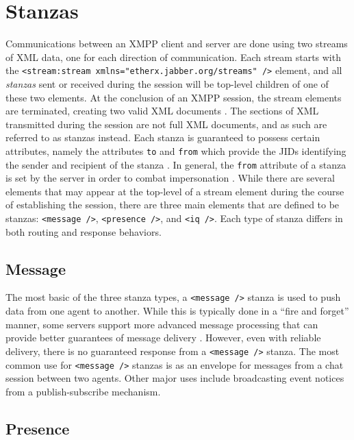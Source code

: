 \section{Stanzas}
\label{sec:Stanzas}

Communications between an XMPP client and server are done using two streams of
XML data, one for each direction of communication. Each stream starts with the
\texttt{<stream:stream xmlns="etherx.jabber.org/streams" />} element, and all
\textit{stanzas} sent or received during the session will be top-level children
of one of these two elements. At the conclusion of an XMPP session, the stream
elements are terminated, creating two valid XML documents \cite{RFC3920}. The
sections of XML transmitted during the session are not full XML documents,
and as such are referred to as stanzas instead. Each stanza is guaranteed to
possess certain attributes, namely the attributes \texttt{to} and \texttt{from}
which provide the JIDs identifying the sender and recipient of the stanza
\cite{RFC3920}. In general, the \texttt{from} attribute of a stanza is set by
the server in order to combat impersonation \cite{RFC3920}. While
there are several elements that may appear at the top-level of a stream element
during the course of establishing the session, there are three main elements
that are defined to be stanzas: \texttt{<message />}, \texttt{<presence />},
and \texttt{<iq />}. Each type of stanza differs in both routing and response
behaviors.

\subsection{Message}
\label{sec:Message}

The most basic of the three stanza types, a \texttt{<message />} stanza is used
to push data from one agent to another. While this is typically done in a ``fire
and forget'' manner, some servers support more advanced message processing that
can provide better guarantees of message delivery \cite{XEP-0079}. However, even
with reliable delivery, there is no guaranteed response from a \texttt{<message
/>} stanza. The most common use for \texttt{<message />} stanzas is as an
envelope for messages from a chat session between two agents. Other major uses
include broadcasting event notices from a publish-subscribe mechanism.

\subsection{Presence}
\label{sec:Presence}

